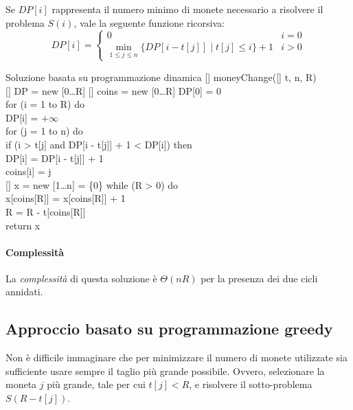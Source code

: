 \noindent
Se $DP[i]$ rappresenta il numero minimo di monete necessario a risolvere il
problema $S(i)$, vale la seguente funzione ricorsiva:
\[DP[i]=\begin{cases}
    0 & i=0\\
    \min_{1\leq j\leq n}\{DP[i-t[j]]\;|\;t[j]\leq i\}+1 & i>0
\end{cases}\]

\begin{minicode}{Soluzione basata su programmazione dinamica}
\ind{}[] moneyChange([] t,  n,  R)\\
    [] DP = new [0\dots R]\hfill{}
    [] coins = new [0\dots R]\hfill{}
    DP[0] = 0\\
    \indf for (i = 1 to R) do\\
        DP[i] = $+\infty$\\
        \indff for (j = 1 to n) do\\
            \indfff if (i > t[j] and DP[i - t[j]] + 1 < DP[i]) then\\
                DP[i] = DP[i - t[j]] + 1\\
                coins[i] = j\\
    \indf{}
    \indf{}[] x = new [1\dots n] = \{0\}\hfill{}
    \indf while (R > 0) do\\
        x[coins[R]] = x[coins[R]] + 1\\
        R = R - t[coins[R]]\\
    \indf return x
\end{minicode}

\paragraph{Complessità}
La \emph{complessità} di questa soluzione è $\Theta(nR)$ per la presenza dei
due cicli annidati.

\subsection{Approccio basato su programmazione greedy}
Non è difficile immaginare che per minimizzare il numero di monete utilizzate
sia sufficiente usare sempre il taglio più grande possibile. Ovvero, selezionare
la moneta $j$ più grande, tale per cui $t[j]<R$, e risolvere il sotto-problema
$S(R-t[j])$.

